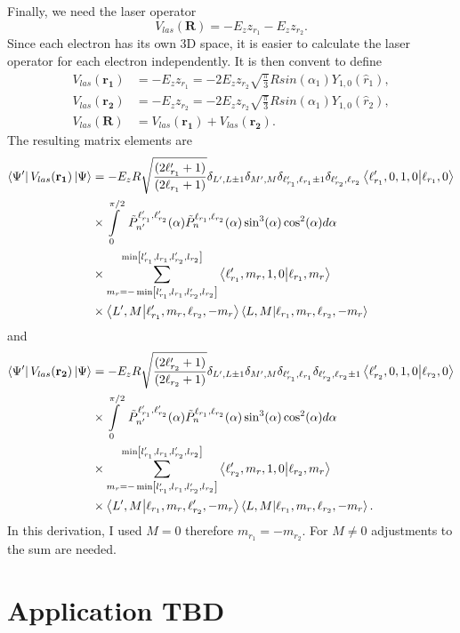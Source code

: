 Finally, we need the laser operator
\begin{equation}
     V_{las}(\mathbf{R}) = - E_z z_{r_1} - E_z z_{r_2}.
\end{equation} 
Since each electron has its own 3D space, it is easier to calculate the laser operator for each electron independently. It is then convent to define 
\begin{align}
    V_{las}(\mathbf{r_1}) &= - E_z z_{r_1} = -2 E_z z_{r_2} \sqrt{\frac{\pi}{3}}Rsin(\alpha_1)Y_{1,0}(\hat{r}_1),\\
    V_{las}(\mathbf{r_2}) &= - E_z z_{r_2} = -2 E_z z_{r_2} \sqrt{\frac{\pi}{3}}Rsin(\alpha_1)Y_{1,0}(\hat{r}_2),\\
    V_{las}(\mathbf{R}) &= V_{las}(\mathbf{r_1})+V_{las}(\mathbf{r_2}).
\end{align}
The resulting matrix elements are
\begin{align}
    \bra{\Psi'}V_{las}(\mathbf{r_1})\ket{\Psi} &= - E_z R\sqrt{\frac{(2\ell_{r_1}'+1)}{(2\ell_{r_1}+1)}}\delta_{L',L\pm1}\delta_{M',M}\delta_{\ell_{r_1}',\ell_{r_1}\pm1}\delta_{\ell_{r_2}',\ell_{r_2}}\bra{\ell_{r_1}',0,1,0}\ket{\ell_{r_1},0} \\
    & \times \int\limits_0^{\pi/2}\ \tilde{P}^{\ell_{r_1}',\ell_{r_2}'}_{n'}(\alpha) \tilde{P}^{\ell_{r_1},\ell_{r_2}}_{n}(\alpha) \sin^3(\alpha) \cos^2(\alpha)d\alpha\\
    &\times \sum_{m_{r}=-\min
    \left[l_{r_1}',l_{r_1},l_{r_2}',l_{r_2}\right]}^{\min
    \left[l_{r_1}',l_{r_1},l_{r_2}',l_{r_2}\right]} \bra{\ell_{r_1}',m_{r},1,0}\ket{\ell_{r_1},m_{r}} \\
    &\times\bra{L',M}\ket{\ell_{r_1}',m_{r},\ell_{r_2},-m_{r}}\bra{L,M}\ket{\ell_{r_1},m_{r},\ell_{r_2},-m_{r}}
\end{align}
and 
\begin{align}
    \bra{\Psi'}V_{las}(\mathbf{r_2})\ket{\Psi} &= - E_z R\sqrt{\frac{(2\ell_{r_2}'+1)}{(2\ell_{r_2}+1)}}\delta_{L',L\pm1}\delta_{M',M}\delta_{\ell_{r_1}',\ell_{r_1}}\delta_{\ell_{r_2}',\ell_{r_2}\pm1}\bra{\ell_{r_2}',0,1,0}\ket{\ell_{r_2},0} \\
    & \times \int\limits_0^{\pi/2}\ \tilde{P}^{\ell_{r_1}',\ell_{r_2}'}_{n'}(\alpha) \tilde{P}^{\ell_{r_1},\ell_{r_2}}_{n}(\alpha) \sin^3(\alpha) \cos^2(\alpha)d\alpha\\
    &\times \sum_{m_{r}=-\min
    \left[l_{r_1}',l_{r_1},l_{r_2}',l_{r_2}\right]}^{\min
    \left[l_{r_1}',l_{r_1},l_{r_2}',l_{r_2}\right]} \bra{\ell_{r_2}',m_{r},1,0}\ket{\ell_{r_2},m_{r}} \\
    &\times\bra{L',M}\ket{\ell_{r_1},m_{r},\ell_{r_2}',-m_{r}}\bra{L,M}\ket{\ell_{r_1},m_{r},\ell_{r_2},-m_{r}}.
\end{align}
In this derivation, I used $M=0$ therefore $m_{r_1}=-m_{r_2}$. For $M\ne0$ adjustments to the sum are needed.


\section{Application TBD} %
\label{sec:application_tbd}

